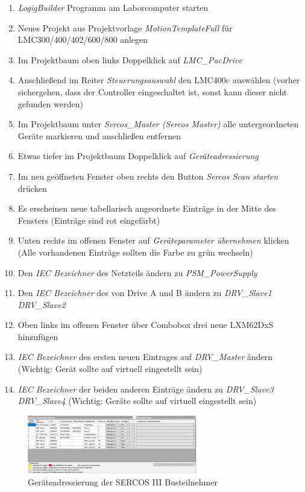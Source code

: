 \documentclass[../../../Bachelorarbeit.tex]{subfiles}
\begin{document}
\begin{enumerate}
    \item \textit{LogigBuilder} Programm am Laborcomputer starten
    \item Neues Projekt aus Projektvorlage \textit{MotionTemplateFull} für LMC300/400/402/600/800 anlegen
    \item Im Projektbaum oben links Doppelklick auf \textit{LMC\_PacDrive}
    \item Anschließend im Reiter \textit{Steuerungsauswahl} den LMC400c auswählen (vorher sichergehen, dass der Controller eingeschaltet ist, sonst kann dieser nicht gefunden werden)
    \item Im Projektbaum unter \textit{Sercos\_Master (Sercos Master)} alle untergeordneten Geräte markieren und anschließen entfernen
    \item Etwas tiefer im Projektbaum Doppelklick auf \textit{Geräteadressierung}
    \item Im neu geöffneten Fenster oben rechts den Button \textit{Sercos Scan starten} drücken
    \item Es erscheinen neue tabellarisch angeordnete Einträge in der Mitte des Fensters (Einträge sind rot eingefärbt)
    \item Unten rechts im offenen Fenster auf \textit{Geräteparameter übernehmen} klicken (Alle vorhandenen Einträge sollten die Farbe zu grün wechseln)
    \item Den \textit{IEC Bezeichner} des Netzteils ändern zu \textit{PSM\_PowerSupply}
    \item Den \textit{IEC Bezeichner} des von Drive A und B ändern zu \textit{DRV\_Slave1} \bzw \\ \textit{DRV\_Slave2}
    \item Oben links im offenen Fenster über Combobox drei neue LXM62DxS hinzufügen
    \item \textit{IEC Bezeichner} des ersten neuen Eintrages auf \textit{DRV\_Master} ändern (Wichtig: Gerät sollte auf virtuell eingestellt sein)
    \item \textit{IEC Bezeichner} der beiden anderen Einträge ändern zu \textit{DRV\_Slave3} \bzw \\ \textit{DRV\_Slave4} (Wichtig: Geräte sollte auf virtuell eingestellt sein)
\end{enumerate}

\begin{figure}[H]
    \centering
    \includegraphics[width=0.66\textwidth]{Images/Sercos.png}
    \caption[Geräteaddressierung]{Geräteadressierung der SERCOS III Busteilnehmer}
    \label{fig:my-img24}
\end{figure}
\end{document}
